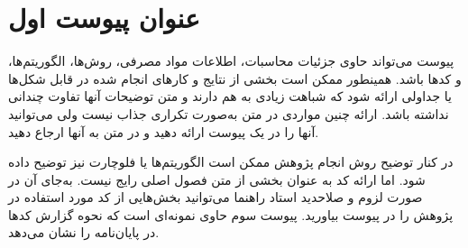 \chapter{عنوان پیوست اول}
پیوست می‌تواند حاوی جزئیات محاسبات، اطلاعات مواد مصرفی، روش‌ها، الگوریتم‌ها، و کدها باشد. همینطور ممکن است بخشی از نتایج و کارهای انجام شده در قابل شکل‌ها یا جداولی ارائه شود که شباهت زیادی به هم دارند و متن توضیحات آنها تفاوت چندانی نداشته باشد. ارائه چنین مواردی در متن 
\thesis 
به‌صورت تکراری جذاب نیست ولی می‌توانید آنها را در یک پیوست ارائه دهید و در متن 
\thesis 
به آنها ارجاع دهید. 

در کنار توضیح روش انجام پژوهش ممکن است الگوریتم‌ها یا فلوچارت نیز توضیح داده شود. اما ارائه کد به عنوان بخشی از متن فصول اصلی 
\thesis 
رایج نیست. به‌جای آن در صورت لزوم و صلاحدید استاد راهنما می‌توانید بخش‌هایی از کد مورد استفاده در پژوهش را در پیوست بیاورید. پیوست سوم حاوی نمونه‌ای است که نحوه گزارش کدها در پایان‌نامه را نشان می‌دهد.

